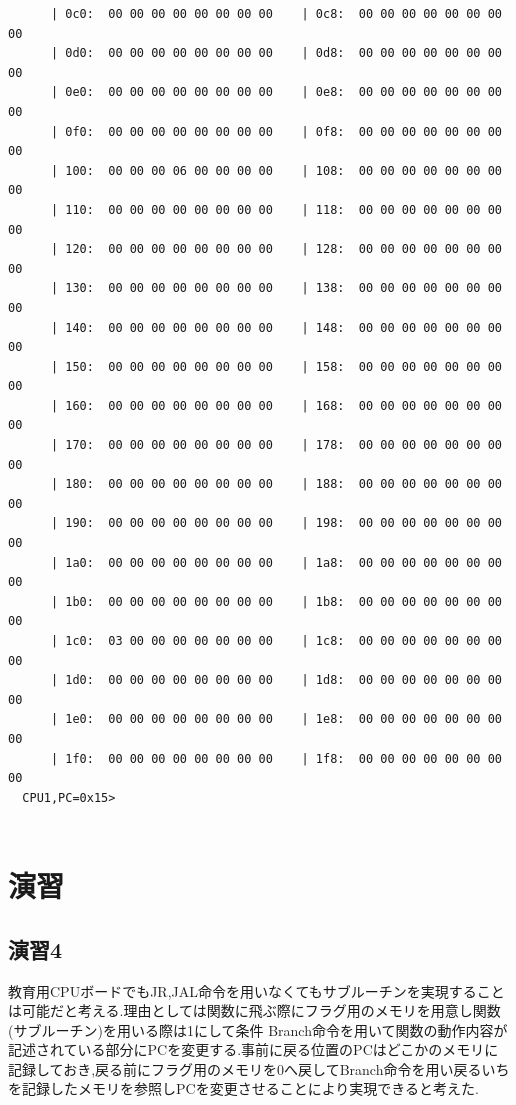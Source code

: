 \documentclass[dvipdfmx]{jsarticle}
\begin{document}
\begin{verbatim}
      | 0c0:  00 00 00 00 00 00 00 00    | 0c8:  00 00 00 00 00 00 00 00
      | 0d0:  00 00 00 00 00 00 00 00    | 0d8:  00 00 00 00 00 00 00 00
      | 0e0:  00 00 00 00 00 00 00 00    | 0e8:  00 00 00 00 00 00 00 00
      | 0f0:  00 00 00 00 00 00 00 00    | 0f8:  00 00 00 00 00 00 00 00
      | 100:  00 00 00 06 00 00 00 00    | 108:  00 00 00 00 00 00 00 00
      | 110:  00 00 00 00 00 00 00 00    | 118:  00 00 00 00 00 00 00 00
      | 120:  00 00 00 00 00 00 00 00    | 128:  00 00 00 00 00 00 00 00
      | 130:  00 00 00 00 00 00 00 00    | 138:  00 00 00 00 00 00 00 00
      | 140:  00 00 00 00 00 00 00 00    | 148:  00 00 00 00 00 00 00 00
      | 150:  00 00 00 00 00 00 00 00    | 158:  00 00 00 00 00 00 00 00
      | 160:  00 00 00 00 00 00 00 00    | 168:  00 00 00 00 00 00 00 00
      | 170:  00 00 00 00 00 00 00 00    | 178:  00 00 00 00 00 00 00 00
      | 180:  00 00 00 00 00 00 00 00    | 188:  00 00 00 00 00 00 00 00
      | 190:  00 00 00 00 00 00 00 00    | 198:  00 00 00 00 00 00 00 00
      | 1a0:  00 00 00 00 00 00 00 00    | 1a8:  00 00 00 00 00 00 00 00
      | 1b0:  00 00 00 00 00 00 00 00    | 1b8:  00 00 00 00 00 00 00 00
      | 1c0:  03 00 00 00 00 00 00 00    | 1c8:  00 00 00 00 00 00 00 00
      | 1d0:  00 00 00 00 00 00 00 00    | 1d8:  00 00 00 00 00 00 00 00
      | 1e0:  00 00 00 00 00 00 00 00    | 1e8:  00 00 00 00 00 00 00 00
      | 1f0:  00 00 00 00 00 00 00 00    | 1f8:  00 00 00 00 00 00 00 00
  CPU1,PC=0x15> 


\end{verbatim}
\newpage

\section{演習}
  \subsection{演習4}
  教育用CPUボードでもJR,JAL命令を用いなくてもサブルーチンを実現することは可能だと考える.理由としては関数に飛ぶ際にフラグ用のメモリを用意し関数(サブルーチン)を用いる際は1にして条件 Branch命令を用いて関数の動作内容が記述されている部分にPCを変更する.事前に戻る位置のPCはどこかのメモリに記録しておき,戻る前にフラグ用のメモリを0へ戻してBranch命令を用い戻るいちを記録したメモリを参照しPCを変更させることにより実現できると考えた.
\end{document}

